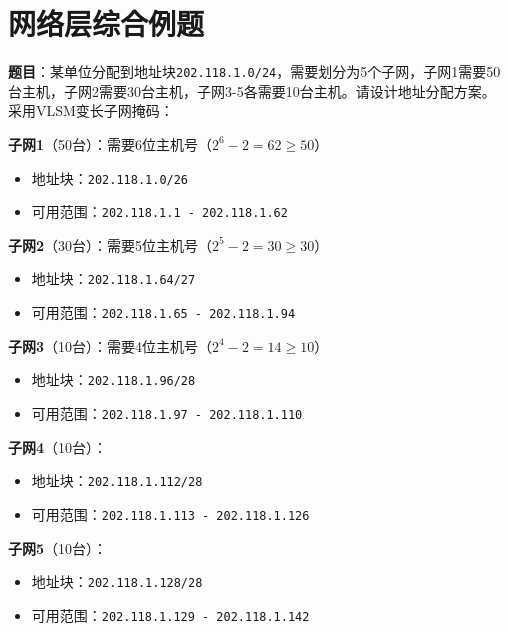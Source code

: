 \section{网络层综合例题}

\begin{examplebox}[例题4.8 子网划分综合]
\textbf{题目}：某单位分配到地址块\texttt{202.118.1.0/24}，需要划分为5个子网，子网1需要50台主机，子网2需要30台主机，子网3-5各需要10台主机。请设计地址分配方案。
\tcblower
采用VLSM变长子网掩码：

\textbf{子网1}（50台）：需要6位主机号（$2^6-2=62\geq50$）
\begin{itemize}[itemsep=0pt]
    \item 地址块：\texttt{202.118.1.0/26}
    \item 可用范围：\texttt{202.118.1.1 - 202.118.1.62}
\end{itemize}

\textbf{子网2}（30台）：需要5位主机号（$2^5-2=30\geq30$）
\begin{itemize}[itemsep=0pt]
    \item 地址块：\texttt{202.118.1.64/27}
    \item 可用范围：\texttt{202.118.1.65 - 202.118.1.94}
\end{itemize}

\textbf{子网3}（10台）：需要4位主机号（$2^4-2=14\geq10$）
\begin{itemize}[itemsep=0pt]
    \item 地址块：\texttt{202.118.1.96/28}
    \item 可用范围：\texttt{202.118.1.97 - 202.118.1.110}
\end{itemize}

\textbf{子网4}（10台）：
\begin{itemize}[itemsep=0pt]
    \item 地址块：\texttt{202.118.1.112/28}
    \item 可用范围：\texttt{202.118.1.113 - 202.118.1.126}
\end{itemize}

\textbf{子网5}（10台）：
\begin{itemize}[itemsep=0pt]
    \item 地址块：\texttt{202.118.1.128/28}
    \item 可用范围：\texttt{202.118.1.129 - 202.118.1.142}
\end{itemize}
\end{examplebox}

